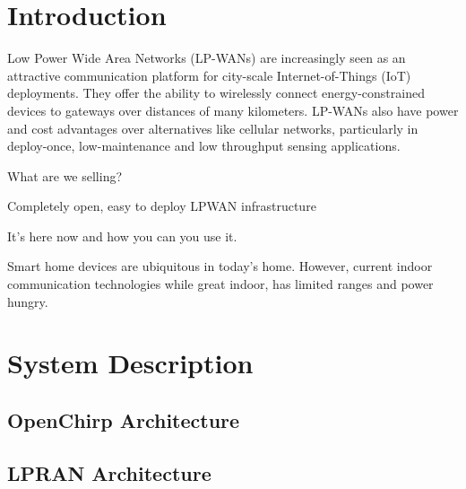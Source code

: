 \documentclass[conference]{IEEEtran}
\begin{document}
\IEEEpeerreviewmaketitle



\section{Introduction}
\label{sec:intro}

Low Power Wide Area Networks (LP-WANs) are increasingly seen as an attractive
communication platform for city-scale Internet-of-Things (IoT) deployments.
They offer the ability to wirelessly connect energy-constrained devices to
gateways over distances of many kilometers. LP-WANs also have power and cost
advantages over alternatives like cellular networks, particularly in
deploy-once, low-maintenance and low throughput sensing applications.

What are we selling?


Completely open, easy to deploy LPWAN infrastructure

It's here now and how you can you use it.


Smart home devices are ubiquitous in today's home. However, current indoor
communication technologies while great indoor, has limited ranges and power
hungry.


\section{System Description}
\label{sec:system}

\subsection{OpenChirp Architecture}
\label{sec:oc-arch}

\subsection{LPRAN Architecture}
\label{sec:lpran-arch}
\end{document}
